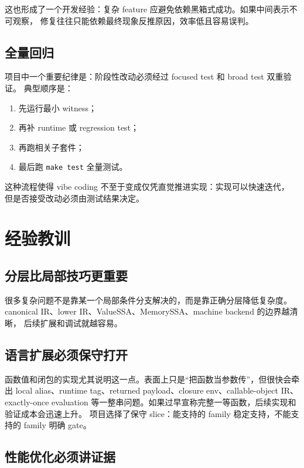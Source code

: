 \documentclass[UTF8,a4paper,11pt]{ctexart}
\begin{document}
这也形成了一个开发经验：复杂 feature 应避免依赖黑箱式成功。如果中间表示不可观察，
修复往往只能依赖最终现象反推原因，效率低且容易误判。

\subsection{全量回归}

项目中一个重要纪律是：阶段性改动必须经过 focused test 和 broad test 双重验证。
典型顺序是：

\begin{enumerate}[label=\arabic*.]
  \item 先运行最小 witness；
  \item 再补 runtime 或 regression test；
  \item 再跑相关子套件；
  \item 最后跑 \texttt{make test} 全量测试。
\end{enumerate}

这种流程使得 vibe coding 不至于变成仅凭直觉推进实现：实现可以快速迭代，
但是否接受改动必须由测试结果决定。

\section{经验教训}

\subsection{分层比局部技巧更重要}

很多复杂问题不是靠某一个局部条件分支解决的，而是靠正确分层降低复杂度。
canonical IR、lower IR、ValueSSA、MemorySSA、machine backend 的边界越清晰，
后续扩展和调试就越容易。

\subsection{语言扩展必须保守打开}

函数值和闭包的实现尤其说明这一点。表面上只是“把函数当参数传”，但很快会牵出
local alias、runtime tag、returned payload、closure env、callable-object IR、
exactly-once evaluation 等一整串问题。如果过早宣称完整一等函数，后续实现和验证成本会迅速上升。
项目选择了保守 slice：能支持的 family 稳定支持，不能支持的 family 明确 gate。

\subsection{性能优化必须讲证据}
\end{document}
